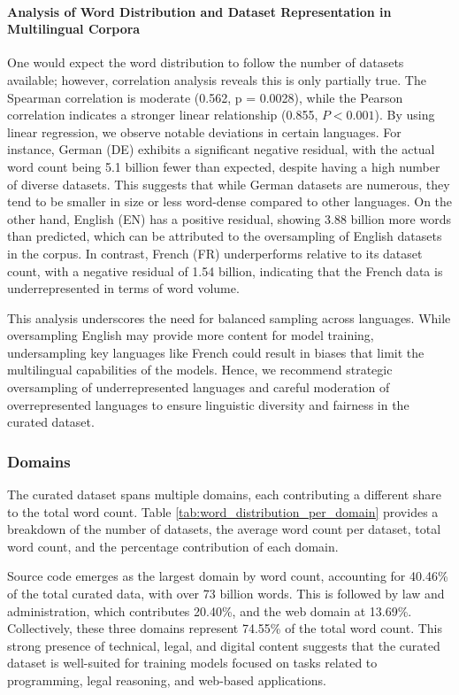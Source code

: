\paragraph{Analysis of Word Distribution and Dataset Representation in Multilingual Corpora}
One would expect the word distribution to follow the number of datasets available; however, correlation analysis reveals this is only partially true. The Spearman correlation is moderate (0.562, p = 0.0028), while the Pearson correlation indicates a stronger linear relationship (0.855, $P < 0.001$). 
By using linear regression, we observe notable deviations in certain languages. For instance, German (DE) exhibits a significant negative residual, with the actual word count being 5.1 billion fewer than expected, despite having a high number of diverse datasets. This suggests that while German datasets are numerous, they tend to be smaller in size or less word-dense compared to other languages. On the other hand, English (EN) has a positive residual, showing 3.88 billion more words than predicted, which can be attributed to the oversampling of English datasets in the corpus. In contrast, French (FR) underperforms relative to its dataset count, with a negative residual of 1.54 billion, indicating that the French data is underrepresented in terms of word volume.

This analysis underscores the need for balanced sampling across languages. While oversampling English may provide more content for model training, undersampling key languages like French could result in biases that limit the multilingual capabilities of the models. Hence, we recommend strategic oversampling of underrepresented languages and careful moderation of overrepresented languages to ensure linguistic diversity and fairness in the curated dataset.


\subsubsection{Domains}



The curated dataset spans multiple domains, each contributing a different share to the total word count. Table \ref{tab:word_distribution_per_domain} provides a breakdown of the number of datasets, the average word count per dataset, total word count, and the percentage contribution of each domain.

Source code emerges as the largest domain by word count, accounting for 40.46\% of the total curated data, with over 73 billion words. This is followed by law and administration, which contributes 20.40\%, and the web domain at 13.69\%. Collectively, these three domains represent 74.55\% of the total word count. This strong presence of technical, legal, and digital content suggests that the curated dataset is well-suited for training models focused on tasks related to programming, legal reasoning, and web-based applications.

